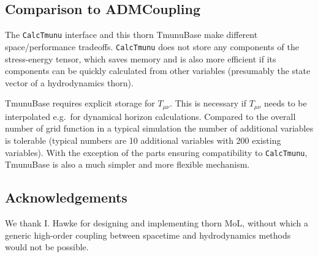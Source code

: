 \documentclass{article}
\begin{document}
\subsection{Comparison to ADMCoupling}

The \texttt{CalcTmunu} interface and this thorn TmunuBase make
different space/performance tradeoffs.  \texttt{CalcTmunu} does not
store any components of the stress-energy tensor, which saves memory
and is also more efficient if its components can be quickly calculated
from other variables (presumably the state vector of a hydrodynamics
thorn).

TmunuBase requires explicit storage for $T_{\mu\nu}$.  This is
necessary if $T_{\mu\nu}$ needs to be interpolated e.g.\ for dynamical
horizon calculations.  Compared to the overall number of grid function
in a typical simulation the number of additional variables is
tolerable (typical numbers are 10 additional variables with 200
existing variables).  With the exception of the parts ensuring
compatibility to \texttt{CalcTmunu}, TmunuBase is also a much simpler
and more flexible mechanism.

\subsection{Acknowledgements}

We thank I. Hawke for designing and implementing thorn MoL, without
which a generic high-order coupling between spacetime and
hydrodynamics methods would not be possible.

\end{document}
